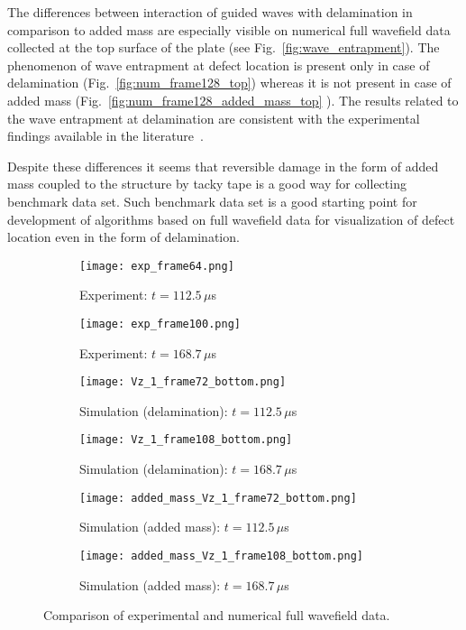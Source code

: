 \documentclass[preprint,12pt]{elsarticle}
\begin{document}
	The differences between interaction of guided waves with delamination in comparison to added mass are especially visible on numerical full wavefield data collected at the top surface of the plate (see Fig.~\ref{fig:wave_entrapment}). The phenomenon of wave entrapment at defect location is present only in case of delamination (Fig.~\ref{fig:num_frame128_top}) whereas it is not present in case of added mass (Fig.~\ref{fig:num_frame128_added_mass_top} ). The results related to the wave entrapment at delamination are consistent with the experimental findings available in the literature~\cite{Glushkov2012}. 
	
	Despite these differences it seems that reversible damage in the form of added mass coupled to the structure by tacky tape is a good way for collecting benchmark data set. Such benchmark data set is a good starting point for development of algorithms based on full wavefield data for visualization of defect location even in the form of delamination.
	
	\begin{figure} [h!]
		\begin{subfigure}[b]{0.49\textwidth}
			\centering
			\texttt{[image: exp\_frame64.png]}
			\caption{Experiment: $t=112.5\,  \mu$s}
			\label{fig:exp_frame64}
		\end{subfigure}
		\begin{subfigure}[b]{0.49\textwidth}
			\centering
			\texttt{[image: exp\_frame100.png]}
			\caption{Experiment: $t=168.7\, \mu$s}
			\label{fig:exp_frame100.png}
		\end{subfigure}
		\hfill
		\begin{subfigure}[b]{0.49\textwidth}
			\centering
			\texttt{[image: Vz\_1\_frame72\_bottom.png]} 
			\caption{Simulation (delamination): $t=112.5\,  \mu$s}
			\label{fig:num_frame72}
		\end{subfigure}
		\hfill
		\begin{subfigure}[b]{0.49\textwidth}
			\centering
			\texttt{[image: Vz\_1\_frame108\_bottom.png]}
			\caption{Simulation (delamination): $t=168.7\, \mu$s}
			\label{fig:num_frame108}
		\end{subfigure}
		\hfill
		\begin{subfigure}[b]{0.49\textwidth}
			\centering
			\texttt{[image: added\_mass\_Vz\_1\_frame72\_bottom.png]} 
			\caption{Simulation (added mass): $t=112.5\,  \mu$s}
			\label{fig:num_frame72_added_mass}
		\end{subfigure}
		\hfill
		\begin{subfigure}[b]{0.49\textwidth}
			\centering
			\texttt{[image: added\_mass\_Vz\_1\_frame108\_bottom.png]}
			\caption{Simulation (added mass): $t=168.7\, \mu$s}
			\label{fig:num_frame108_added_mass}
		\end{subfigure}
		\caption{Comparison of experimental and numerical full wavefield data.} 
		\label{fig:wavefields_comparison}
	\end{figure}
\end{document}
